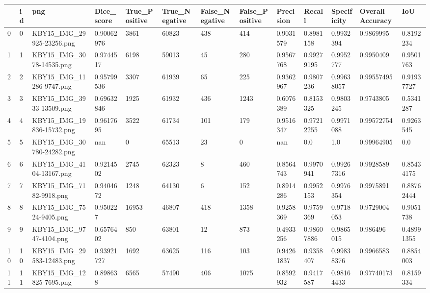 \documentclass[11pt, a4paper, twoside]{report}
\begin{document}
\begin{longtable}[c]{@{}lllllllllllll@{}}
\toprule
 & id & png & Dice\_score & True\_Positive & True\_Negative & False\_Negative & False\_Positive & Precision & Recall & Specificity & Overall Accuracy & IoU \\* \midrule
\endhead
%
\bottomrule
\endfoot
%
\endlastfoot
%
0 & 0 & KBY15\_IMG\_29925-23256.png & 0.90062976 & 3861 & 60823 & 438 & 414 & 0.9031579 & 0.8981158 & 0.9932394 & 0.9869995 & 0.8192234 \\
1 & 1 & KBY15\_IMG\_3078-14535.png & 0.9744517 & 6198 & 59013 & 45 & 280 & 0.9567768 & 0.99279195 & 0.9952777 & 0.9950409 & 0.9501763 \\
2 & 2 & KBY15\_IMG\_11286-9747.png & 0.95799536 & 3307 & 61939 & 65 & 225 & 0.9362967 & 0.9807236 & 0.99638057 & 0.99557495 & 0.91937727 \\
3 & 3 & KBY15\_IMG\_3933-13509.png & 0.69632846 & 1925 & 61932 & 436 & 1243 & 0.6076389 & 0.8153325 & 0.9803245 & 0.9743805 & 0.5341287 \\
4 & 4 & KBY15\_IMG\_19836-15732.png & 0.9617695 & 3522 & 61734 & 101 & 179 & 0.9516347 & 0.97212255 & 0.9971088 & 0.99572754 & 0.9263545 \\
5 & 5 & KBY15\_IMG\_30780-24282.png & nan & 0 & 65513 & 23 & 0 & nan & 0.0 & 1.0 & 0.99964905 & 0.0 \\
6 & 6 & KBY15\_IMG\_4104-13167.png & 0.9214502 & 2745 & 62323 & 8 & 460 & 0.8564743 & 0.9970941 & 0.99267316 & 0.9928589 & 0.85434175 \\
7 & 7 & KBY15\_IMG\_7182-9918.png & 0.9404672 & 1248 & 64130 & 6 & 152 & 0.8914286 & 0.9952153 & 0.9976354 & 0.9975891 & 0.88762444 \\
8 & 8 & KBY15\_IMG\_7524-9405.png & 0.950227 & 16953 & 46807 & 418 & 1358 & 0.9258369 & 0.9759369 & 0.9718053 & 0.9729004 & 0.9051738 \\
9 & 9 & KBY15\_IMG\_9747-4104.png & 0.6576402 & 850 & 63801 & 12 & 873 & 0.4933256 & 0.98607886 & 0.9865015 & 0.986496 & 0.48991355 \\
10 & 10 & KBY15\_IMG\_29583-12483.png & 0.93921727 & 1692 & 63625 & 116 & 103 & 0.94261837 & 0.9358407 & 0.99838376 & 0.9966583 & 0.8854003 \\
11 & 11 & KBY15\_IMG\_12825-7695.png & 0.898638 & 6565 & 57490 & 406 & 1075 & 0.8592932 & 0.9417587 & 0.98164433 & 0.97740173 & 0.8159334 \\

\end{longtable}
\end{document}
